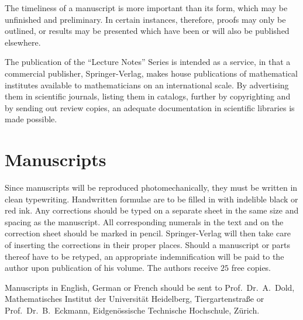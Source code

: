 \medskip
The timeliness of a manuscript is more important than its form, which may be unfinished and preliminary. In certain instances, therefore, proofs may only be outlined, or results may be presented which have been or will also be published elsewhere.

\medskip
The publication of the ``Lecture Notes'' Series is intended as a service, in that a commercial publisher, Springer-Verlag, makes house publications of mathematical institutes available to mathematicians on an international scale. By advertising them in scientific journals, listing them in catalogs, further by copyrighting and by sending out review copies, an adequate documentation in scientific libraries is made possible.

\section*{Manuscripts}
Since manuscripts will be reproduced photomechanically, they must be written in clean typewriting. Handwritten formulae are to be filled in with indelible black or red ink. Any corrections should be typed on a separate sheet in the same size and spacing as the manuscript. All corresponding numerals in the text and on the correction sheet should be marked in pencil. Springer-Verlag will then take care of inserting the corrections in their proper places. Should a manuscript or parts thereof have to be retyped, an appropriate indemnification will be paid to the author upon publication of his volume. The authors receive $25$ free copies.

\medskip
Manuscripts in English, German or French should be sent to Prof.\ Dr.\ A.\ Dold, Mathematisches Institut der Universit\"at Heidelberg, Tiergartenstra\ss{}e or Prof.\ Dr.\ B.\ Eckmann, Eidgen\"ossische Technische Hochschule, Z\"urich.

\clearpage

\tableofcontents
